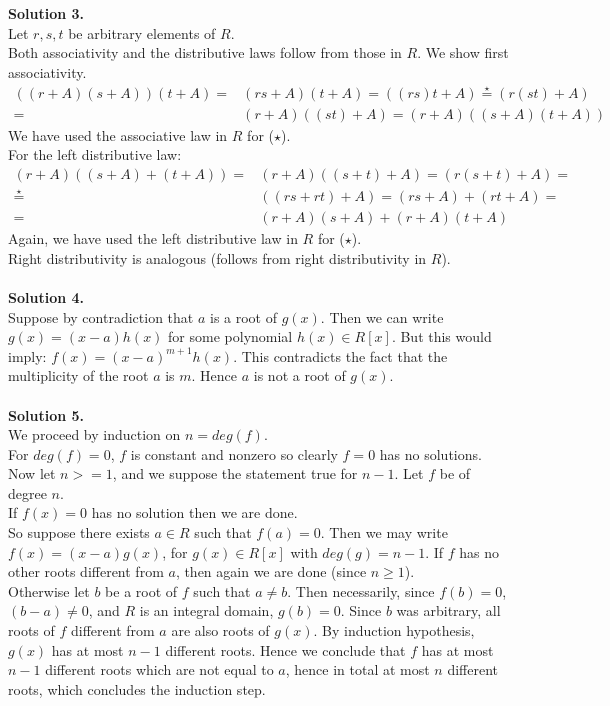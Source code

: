 \documentclass[12pt,a4paper]{article}
\begin{document}
\textbf{Solution 3.  }\\

Let $r,s,t$ be arbitrary elements of $R$. \\
Both associativity and the distributive laws follow from those in $R$.
We show first associativity. 
\begin{align*}
((r+A)(s+A))(t+A)= & (rs+A)(t+A)=( (rs)t+A)\stackrel{\star}{=} (r(st)+A) \\
= & (r+A)((st)+A)=(r+A)((s+A)(t+A))
\end{align*}
We have used the associative law in $R$ for ($\star$).\\
For the left distributive law: 
\begin{align*}
(r+A)((s+A)+(t+A))= & (r+A)((s+t)+A) = (r(s+t) + A) = \\
\stackrel{\star}{=} &((rs + rt) + A) = (rs+A)+ (rt+A) = \\
= & (r+A)(s+A) + (r+A)(t+A)
\end{align*}
Again, we have used the left distributive law in $R$ for ($\star$).\\
Right distributivity is analogous (follows from right distributivity in $R$). 
\\
\\
\textbf{Solution 4.  }\\

Suppose by contradiction that $a$ is a root of $g(x)$. Then we can write $g(x)=(x-a)h(x)$ for some polynomial $h(x)\in R[x]$. But this would imply: $f(x)=(x-a)^{m+1}h(x)$. This contradicts the fact that the multiplicity of the root $a$ is $m$. Hence $a$ is not a root of $g(x)$. 
\\
\\
\textbf{Solution 5.  }\\

We proceed by induction on $n=deg(f)$.  \\
For $deg(f)=0$, $f$ is constant and nonzero so clearly $f=0$ has no solutions. \\
Now let $n>=1$, and we suppose the statement true for $n-1$. Let $f$ be of degree $n$. \\ 
If $f(x)=0$ has no solution then we are done. \\
So suppose there exists $a\in R$ such that $f(a)=0$. 
Then we may write $f(x)=(x-a)g(x)$, for $g(x)\in R[x]$ with $deg(g)= n-1$. If $f$ has no other roots different from $a$, then again we are done (since $n\geq1$). \\
Otherwise let $b$ be a root of $f$ such that $a\neq b$. 
Then necessarily, since $f(b)=0$, $(b-a)\neq 0$, and $R$ is an integral domain, $g(b)=0$. Since $b$ was arbitrary, all roots of $f$ different from $a$ are also roots of $g(x)$. 
By induction hypothesis, $g(x)$ has at most $n-1$ different roots.
Hence we conclude that $f$ has at most $n-1$ different roots which are not equal to $a$, hence in total at most $n$ different roots, which concludes the induction step. \\
\end{document}
